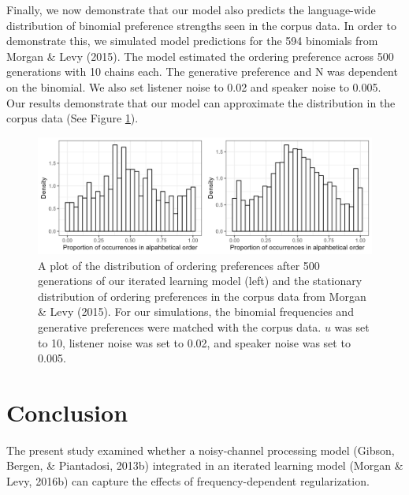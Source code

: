 \documentclass[10pt, letterpaper]{article}
\newenvironment{CodeChunk}{}{}
\begin{document}
Finally, we now demonstrate that our model also predicts the
language-wide distribution of binomial preference strengths seen in the
corpus data. In order to demonstrate this, we simulated model
predictions for the 594 binomials from Morgan \& Levy (2015). The model
estimated the ordering preference across 500 generations with 10 chains
each. The generative preference and N was dependent on the binomial. We
also set listener noise to 0.02 and speaker noise to 0.005. Our results
demonstrate that our model can approximate the distribution in the
corpus data (See Figure \ref{fig:corpusourmodel}).

\begin{CodeChunk}
\begin{figure}[tb]

{\centering \includegraphics[width=1\linewidth]{Figures/corpus_plot_and_ours} 

}

\caption[A plot of the distribution of ordering preferences after 500 generations of our iterated learning model (left) and the stationary distribution of ordering preferences in the corpus data from Morgan \& Levy (2015)]{A plot of the distribution of ordering preferences after 500 generations of our iterated learning model (left) and the stationary distribution of ordering preferences in the corpus data from Morgan \& Levy (2015). For our simulations, the binomial frequencies and generative preferences were matched with the corpus data. $
u$ was set to 10, listener noise was set to 0.02, and speaker noise was set to 0.005.}\label{fig:corpusourmodel}
\end{figure}
\end{CodeChunk}

\hypertarget{conclusion}{%
\section{Conclusion}\label{conclusion}}

The present study examined whether a noisy-channel processing model
(Gibson, Bergen, \& Piantadosi, 2013b) integrated in an iterated
learning model (Morgan \& Levy, 2016b) can capture the effects of
frequency-dependent regularization.
\end{document}
